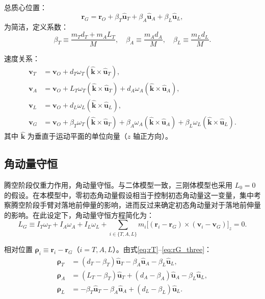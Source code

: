 \documentclass{article}
\begin{document}
总质心位置：
\begin{equation}
\mathbf{r}_G = \mathbf{r}_O + \beta_T \hat{\mathbf{u}}_T + \beta_A \hat{\mathbf{u}}_A + \beta_L \hat{\mathbf{u}}_L, \label{eq:rG_three}
\end{equation}
为简洁，定义系数：
\begin{equation}
\boxed{\beta_T \equiv \frac{m_T d_T + m_A L_T}{M},\quad
       \beta_A \equiv \frac{m_A d_A}{M},\quad
       \beta_L \equiv \frac{m_L d_L}{M}}. \label{eq:beta_def}
\end{equation}

速度关系：
\begin{align}
\mathbf{v}_T &= \mathbf{v}_O + d_T \omega_T (\hat{\mathbf{k}}\times\hat{\mathbf{u}}_T), \label{eq:vT} \\
\mathbf{v}_A &= \mathbf{v}_O + L_T \omega_T (\hat{\mathbf{k}}\times\hat{\mathbf{u}}_T) + d_A \omega_A (\hat{\mathbf{k}}\times\hat{\mathbf{u}}_A), \label{eq:vA} \\
\mathbf{v}_L &= \mathbf{v}_O + d_L \omega_L (\hat{\mathbf{k}}\times\hat{\mathbf{u}}_L), \label{eq:vL} \\
\mathbf{v}_G &= \mathbf{v}_O + \beta_T \omega_T (\hat{\mathbf{k}}\times\hat{\mathbf{u}}_T) + \beta_A \omega_A (\hat{\mathbf{k}}\times\hat{\mathbf{u}}_A) + \beta_L \omega_L (\hat{\mathbf{k}}\times\hat{\mathbf{u}}_L). \label{eq:vG_three}
\end{align}
其中 $\hat{\mathbf{k}}$ 为垂直于运动平面的单位向量（$z$ 轴正方向）。

\subsection{角动量守恒}

腾空阶段仅重力作用，角动量守恒。与二体模型一致，三刚体模型也采用 $L_0 = 0$ 的假设。在本模型中，零初态角动量假设相当于控制初态角动量这一变量，集中考察腾空阶段手臂对落地前伸量的影响，进而反过来确定初态角动量对于落地前伸量的影响。在此设定下，角动量守恒方程简化为：
\begin{equation}
L_G \equiv I_T\omega_T + I_A\omega_A + I_L\omega_L
       + \sum_{i\in\{T,A,L\}} m_i\bigl[(\mathbf{r}_i-\mathbf{r}_G)\times(\mathbf{v}_i-\mathbf{v}_G)\bigr]_z = 0. \label{eq:LG_three}
\end{equation}

相对位置 $\boldsymbol{\rho}_i \equiv \mathbf{r}_i - \mathbf{r}_G$（$i=T,A,L$）。由式\eqref{eq:rT}--\eqref{eq:rG_three}：
\begin{align}
\boldsymbol{\rho}_T &= (d_T - \beta_T)\hat{\mathbf{u}}_T - \beta_A\hat{\mathbf{u}}_A - \beta_L\hat{\mathbf{u}}_L, \label{eq:rhoT} \\
\boldsymbol{\rho}_A &= (L_T - \beta_T)\hat{\mathbf{u}}_T + (d_A - \beta_A)\hat{\mathbf{u}}_A - \beta_L\hat{\mathbf{u}}_L, \label{eq:rhoA} \\
\boldsymbol{\rho}_L &= -\beta_T\hat{\mathbf{u}}_T - \beta_A\hat{\mathbf{u}}_A + (d_L - \beta_L)\hat{\mathbf{u}}_L. \label{eq:rhoL}
\end{align}
\end{document}

